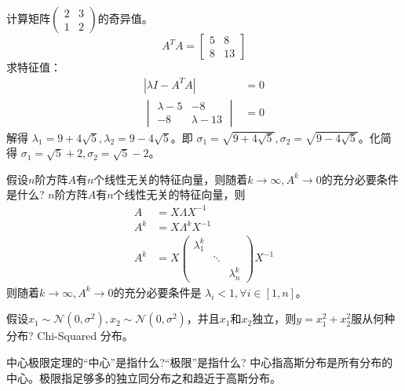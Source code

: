 \begin{problem}
	计算矩阵$\begin{pmatrix}2&3\\1&2\end{pmatrix}$的奇异值。
	\solution \[A^TA = \begin{bmatrix}
		5 & 8 \\
		8 & 13
	\end{bmatrix}\]
	求特征值：\begin{align*}
		|\lambda I - A^TA| &= 0\\
		\begin{vmatrix}
			\lambda - 5 & -8 \\
			-8 & \lambda - 13
		\end{vmatrix} &= 0
	\end{align*}
	解得 $\lambda_1 = 9 + 4\sqrt{5}, \lambda_2 = 9 - 4\sqrt{5}$。即 $\sigma_1 = \sqrt{9 + 4\sqrt{5}}, \sigma_2 = \sqrt{9 - 4\sqrt{5}}$。化简得 $\sigma_1 = \sqrt{5} + 2, \sigma_2 = \sqrt{5} - 2$。
\end{problem}

\begin{problem}
	假设$n$阶方阵$A$有$n$个线性无关的特征向量，则随着$k\to \infty,A^k\to 0$的充分必要条件是什么?
	\solution $n$阶方阵$A$有$n$个线性无关的特征向量，则 $$\begin{aligned}
		A &= X\Lambda X^{-1} \\	
		A^k &= X \Lambda^k X^{-1}\\
		A^k &= X \begin{pmatrix}  
			\lambda_1^k &  &  \\  
			 & \ddots & \\  
			 &  & \lambda_n^k  
		\end{pmatrix} X^{-1} 
	\end{aligned}$$
	则随着$k\to \infty,A^k\to 0$的充分必要条件是 $\lambda_i < 1,\forall i\in [1, n]$。
\end{problem}

\begin{problem}
	假设$x_1\sim \mathcal{N}(0,\sigma^2),x_2\sim\mathcal{N}(0,\sigma^2)$，并且$x_1$和$x_2$独立，则$y=x_1^2+x_2^2$服从何种分布?
	\solution Chi-Squared 分布。
\end{problem}

\begin{problem}
	中心极限定理的“中心”是指什么?“极限”是指什么?
	\solution 中心指高斯分布是所有分布的中心。极限指足够多的独立同分布之和趋近于高斯分布。
\end{problem}


